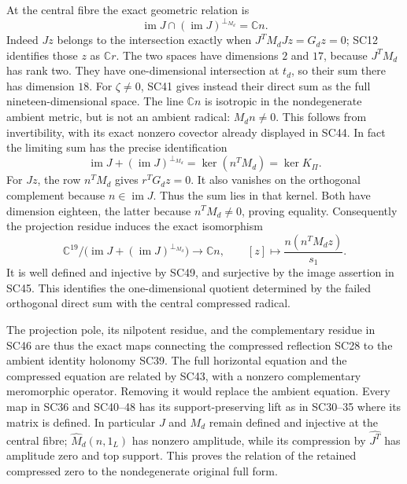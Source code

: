 At the central fibre the exact geometric relation is
\[
 \operatorname{im}J\cap(\operatorname{im}J)^{\perp_{M_d}}
     =\mathbb Cn .
 \tag{SC48}
\]
Indeed \(Jz\) belongs to the intersection exactly when
\(J^TM_dJz=G_dz=0\); SC12 identifies those \(z\) as
\(\mathbb Cr\). The two spaces have dimensions \(2\) and
\(17\), because \(J^TM_d\) has rank two. They have
one-dimensional intersection at \(t_d\), so their sum there
has dimension \(18\). For \(\zeta\ne0\), SC41 gives instead
their direct sum as the full nineteen-dimensional space.
The line \(\mathbb Cn\) is isotropic in the nondegenerate
ambient metric, but is not an ambient radical: \(M_dn\ne0\).
This follows from invertibility, with its exact nonzero
covector already displayed in SC44.
In fact the limiting sum has the precise identification
\[
 \operatorname{im}J+(\operatorname{im}J)^{\perp_{M_d}}
   =\ker(n^TM_d)=\ker K_\Pi .
 \tag{SC49}
\]
For \(Jz\), the row \(n^TM_d\) gives
\(r^TG_dz=0\). It also vanishes on the orthogonal complement
because \(n\in\operatorname{im}J\). Thus the sum lies in that
kernel. Both have dimension eighteen, the latter because
\(n^TM_d\ne0\), proving equality.
Consequently the projection residue induces the exact
isomorphism
\[
 \mathbb C^{19}/\bigl(\operatorname{im}J+
            (\operatorname{im}J)^{\perp_{M_d}}\bigr)
 \longrightarrow\mathbb Cn,\qquad
 [z]\longmapsto \frac{n(n^TM_dz)}{s_1}.
\]
It is well defined and injective by SC49, and surjective
by the image assertion in SC45. This identifies the
one-dimensional quotient determined by the failed
orthogonal direct sum with the central compressed radical.

The projection pole, its nilpotent residue, and the
complementary residue in SC46 are thus the exact maps
connecting the compressed reflection SC28 to the ambient
identity holonomy SC39. The full horizontal equation and
the compressed equation are related by SC43, with a
nonzero complementary meromorphic operator. Removing it
would replace the ambient equation. Every map in SC36 and
SC40--48 has its support-preserving lift as in SC30--35
where its matrix is defined. In particular \(J\) and \(M_d\)
remain defined and injective at the central fibre;
\(\widehat M_d(n,1_L)\) has nonzero amplitude, while its
compression by \(\widehat{J^T}\) has amplitude zero and
top support. This proves the relation of the retained
compressed zero to the nondegenerate original full form.

